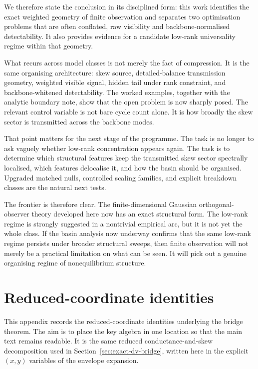 \documentclass[11pt,a4paper]{article}
\numberwithin{equation}{section}
\theoremstyle{thmcompact}
\theoremstyle{remark}
\begin{document}
We therefore state the conclusion in its disciplined form: this work identifies the exact weighted geometry of finite observation and separates two optimisation problems that are often conflated, raw visibility and backbone-normalised detectability. It also provides evidence for a candidate low-rank universality regime within that geometry.

What recurs across model classes is not merely the fact of compression. It is the same organising architecture: skew source, detailed-balance transmission geometry, weighted visible signal, hidden tail under rank constraint, and backbone-whitened detectability. The worked examples, together with the analytic boundary note, show that the open problem is now sharply posed. The relevant control variable is not bare cycle count alone. It is how broadly the skew sector is transmitted across the backbone modes.

That point matters for the next stage of the programme. The task is no longer to ask vaguely whether low-rank concentration appears again. The task is to determine which structural features keep the transmitted skew sector spectrally localised, which features delocalise it, and how the basin should be organised. Upgraded matched nulls, controlled scaling families, and explicit breakdown classes are the natural next tests.

The frontier is therefore clear. The finite-dimensional Gaussian orthogonal-observer theory developed here now has an exact structural form. The low-rank regime is strongly suggested in a nontrivial empirical arc, but it is not yet the whole class. If the basin analysis now underway confirms that the same low-rank regime persists under broader structural sweeps, then finite observation will not merely be a practical limitation on what can be seen. It will pick out a genuine organising regime of nonequilibrium structure.

\appendix

\section{Reduced-coordinate identities}
\label{app:reduced_coordinate_identities}

This appendix records the reduced-coordinate identities underlying the bridge theorem. The aim is to place the key algebra in one location so that the main text remains readable. It is the same reduced conductance-and-skew decomposition used in Section~\ref{sec:exact-dv-bridge}, written here in the explicit \((x,y)\) variables of the envelope expansion.
\end{document}
